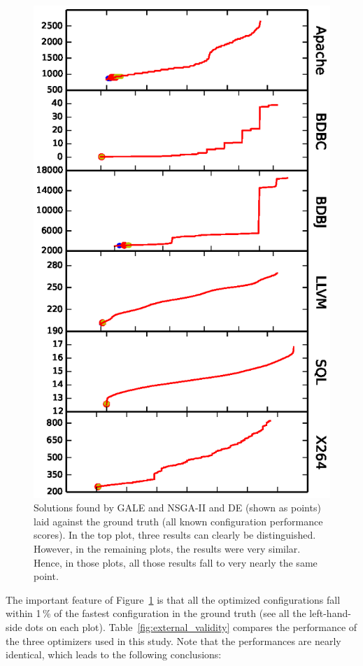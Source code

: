 \documentclass{sig-alternative}
\newcommand{\fig}[1]{Figure~\ref{fig:#1}}
\begin{document}
\begin{figure}[!t]
\includegraphics[width=0.9\linewidth]{Figures/optimizer_result.eps}
\caption{Solutions found by GALE and NSGA-II and DE (shown as points) laid against the ground truth (all known configuration performance scores). In the top plot, three results can clearly be distinguished. 
However, in the remaining plots, the results were very similar. Hence, in those plots, all those results
fall to very nearly the same point.}\label{fig:performance_graph}
\end{figure}


The important feature of \fig{performance_graph} is that all the optimized configurations fall within 1\,\% of the fastest
configuration in the ground truth (see all the left-hand-side dots on each plot). Table~\ref{fig:external_validity} compares the performance of the three optimizers
used in this study. Note that the performances are nearly identical, which leads to the following conclusions:
\end{document}
